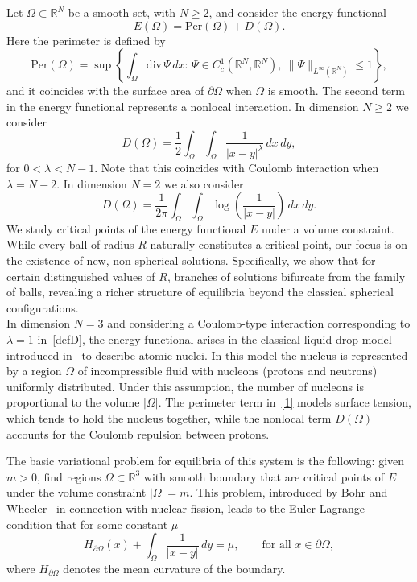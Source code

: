 \documentclass[10pt,reqno,english]{amsart}
\newcommand{\R} {\mathbb R}
\theoremstyle{definition}
\numberwithin{equation}{section}
\begin{document}
Let $\Omega \subset \R^N$ be a smooth set, with $N\geq 2$, and consider the energy functional
\begin{equation}\label{1}
E(\Omega)=\mathrm{Per}(\Omega)+D(\Omega).
\end{equation}
Here the perimeter is defined by
\[
\mathrm{Per}(\Omega)=\sup\left\{\int_\Omega \mathrm{div}\,\Psi\,dx:\,\Psi\in C^1_c(\R^N,\R^N),\ \|\Psi\|_{L^\infty(\R^N)}\le 1\right\},
\]
and it coincides with the surface area of $\partial\Omega$ when $\Omega$ is smooth.
 The second term in the energy functional represents a nonlocal interaction. In dimension $N\geq2$ we consider 
\begin{equation}\label{defD}
D(\Omega)=\frac12\int_\Omega\int_\Omega \frac{1}{|x-y|^\lambda}\,dx\,dy,
\end{equation}
for  $0<\lambda <N-1$. Note that this  coincides with Coulomb interaction when $\lambda = N-2$.
In dimension $N=2$ we also consider
\begin{equation}\label{defD2}
D(\Omega)=\frac{1}{2\pi}\int_\Omega\int_\Omega \log\!\left(\frac{1}{|x-y|}\right)\,dx\,dy.
\end{equation}
We study critical points of the energy functional $E$ under a volume constraint. While every ball of radius $R$ naturally constitutes a critical point, our focus is on the existence of new, non-spherical solutions. Specifically, we show that for certain distinguished values of $R$, branches of solutions bifurcate from the family of balls, revealing a richer structure of equilibria beyond the classical spherical configurations.\\


In dimension $N=3$ and considering a Coulomb-type interaction corresponding to $\lambda = 1$ in~\eqref{defD}, the energy functional arises in the classical liquid drop model introduced in~\cite{bohr,Gamow1930} to describe atomic nuclei. In this model the nucleus is represented by a region $\Omega$ of incompressible fluid with nucleons (protons and neutrons) uniformly distributed.
Under this assumption, the number of nucleons is proportional to the volume $|\Omega|$. The perimeter term in~\eqref{1} models surface tension, which tends to hold the nucleus together, while the nonlocal term $D(\Omega)$ accounts for the Coulomb repulsion between protons.
	
The basic variational problem for equilibria of this system is the following: given $m>0$, find regions $\Omega\subset\R^3$ with smooth boundary that are critical points of $E$ under the volume constraint $|\Omega|=m$. This problem, introduced by Bohr and Wheeler~\cite{BohrWheeler1939} in connection with nuclear fission, leads to the Euler-Lagrange condition that for some constant $\mu$
\begin{equation}
H_{\partial\Omega}(x)+\int_\Omega \frac{1}{|x-y|}\,dy=\mu,
\qquad \text{for all } x\in\partial\Omega,
\label{eq:equation}
\end{equation}
where $H_{\partial\Omega}$ denotes the mean curvature of the boundary.
\end{document}
